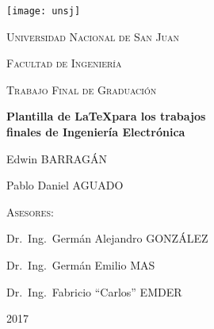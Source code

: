 \begin{titlepage}
	{\centering
	\texttt{[image: unsj]}
	
	\vspace{1cm}
	
	{\scshape\LARGE Universidad Nacional de San Juan}
	
	{\scshape\LARGE Facultad de Ingeniería}
	
	\vspace{1cm}
	
	{\scshape\Large Trabajo Final de Graduación}
	
	\vspace{1.5cm}
	
	{\Huge\bfseries Plantilla de \LaTeX para los trabajos\\finales de Ingeniería Electrónica}
		
	\vspace{2cm}
	
	{\Large Edwin BARRAGÁN\par}
	{\Large Pablo Daniel AGUADO\par}
	\vfill}


\centering
		{\textsc{Asesores:}}
		
{Dr.~Ing.~Germán Alejandro GONZÁLEZ}
		
{Dr.~Ing.~Germán Emilio MAS}

{Dr.~Ing.~Fabricio \enquote{Carlos} EMDER}

	
	\vfill
	
	\centering
	{\large2017}
\end{titlepage}